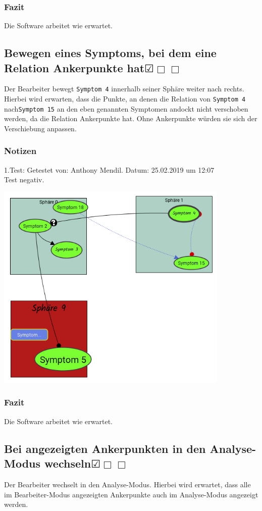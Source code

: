 \documentclass{scrartcl}
\newcommand{\subsectiont}[2]{\subsection[#1]{#1{\normalsize\normalfont #2}}}
\newcommand{\leer}{$\Box$}
\newcommand{\ok}{$\CheckedBox$}
\begin{document}
\subsubsection{Fazit}
Die Software arbeitet wie erwartet.

\subsectiont{Bewegen eines Symptoms, bei dem eine \\Relation Ankerpunkte hat}{\dotfill\ok\leer\leer}
Der Bearbeiter bewegt \texttt{Symptom 4} innerhalb seiner Sphäre weiter nach rechts. Hierbei wird erwarten, dass die Punkte, an denen die Relation von \texttt{Symptom 4} nach\texttt{Symptom 15} an den eben genannten Symptomen andockt nicht verschoben werden, da die Relation Ankerpunkte hat. Ohne Ankerpunkte würden sie sich der Verschiebung anpassen. 
\subsubsection{Notizen}
1.Test: Getestet von: Anthony Mendil. Datum: 25.02.2019 um 12:07 \\
Test negativ. 
\begin{center}
\includegraphics[height=10cm]{3_42.PNG}
\end{center}
\subsubsection{Fazit}
Die Software arbeitet wie erwartet.

\subsectiont{Bei angezeigten Ankerpunkten in den Analyse-Modus wechseln}{\dotfill\ok\leer\leer}
Der Bearbeiter wechselt in den Analyse-Modus. Hierbei wird erwartet, dass alle im Bearbeiter-Modus angezeigten Ankerpunkte auch im Analyse-Modus angezeigt werden. 
\end{document}
